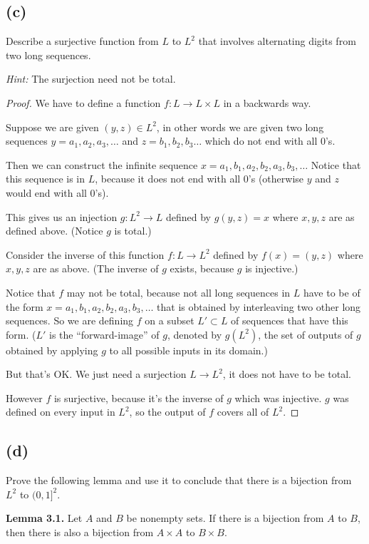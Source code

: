 \documentclass[14pt]{extarticle}
\begin{document}
\subsection{(c)}
Describe a surjective function from $L$ to $L^2$ that involves alternating digits from two long sequences.

\textit{Hint:} The surjection need not be total.

\begin{proof}
We have to define a function $f: L \to L\times L$ in a backwards way. 

Suppose we are given $(y, z) \in L^2$, in other words we are given two long sequences $y = a_1,a_2,a_3,\ldots$ and $z = b_1,b_2,b_3\ldots$ which do not end with all 0's.

Then we can construct the infinite sequence $x = a_1,b_1,a_2,b_2,a_3,b_3,\ldots$ Notice that this sequence is in $L$, because it does not end with all 0's (otherwise $y$ and $z$ would end with all 0's).

This gives us an injection $g: L^2 \to L$ defined by $g(y,z) = x$ where $x,y,z$ are as defined above. (Notice $g$ is total.)

Consider the inverse of this function $f: L \to L^2$ defined by $f(x) = (y,z)$ where $x,y,z$ are as above. (The inverse of $g$ exists, because $g$ is injective.)

Notice that $f$ may not be total, because not all long sequences in $L$ have to be of the form $x = a_1,b_1,a_2,b_2,a_3,b_3,\ldots$ that is obtained by interleaving two other long sequences. So we are defining $f$ on a subset $L' \subset L$ of sequences that have this form. ($L'$ is the ``forward-image'' of $g$, denoted by $g(L^2)$, the set of outputs of $g$ obtained by applying $g$ to all possible inputs in its domain.)

But that's OK. We just need a surjection $L \to L^2$, it does not have to be total.

However $f$ is surjective, because it's the inverse of $g$ which was injective. $g$ was defined on every input in $L^2$, so the output of $f$ covers all of $L^2$.
\end{proof}

\subsection{(d)}
Prove the following lemma and use it to conclude that there is a bijection from $L^2$ to $(0, 1]^2$.

\textbf{Lemma 3.1.} Let $A$ and $B$ be nonempty sets. If there is a bijection from $A$ to $B$, then there is also a bijection from $A \times A$ to $B \times B$.
\end{document}
